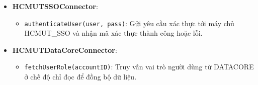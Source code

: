 \begin{itemize}
    \item \textbf{HCMUTSSOConnector}: 
    \begin{itemize}
        \item \texttt{authenticateUser(user, pass)}: Gửi yêu cầu xác thực tới máy chủ HCMUT\_SSO và nhận mã xác thực thành công hoặc lỗi.
    \end{itemize}
    \item \textbf{HCMUTDataCoreConnector}:
    \begin{itemize}
        \item \texttt{fetchUserRole(accountID)}: Truy vấn vai trò người dùng từ DATACORE ở chế độ chỉ đọc để đồng bộ dữ liệu.
    \end{itemize}
\end{itemize}